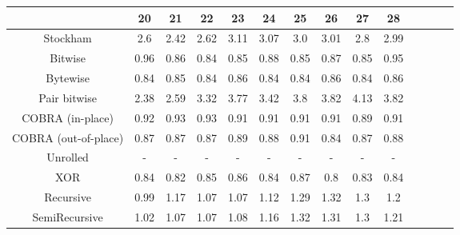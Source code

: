 \begin{tabular}{c|ccccccccccccc}{} &    20 &    21 &    22 &    23 &    24 &    25 &    26 &    27 &    28 \\
\midrule
Stockham             &   2.6 &  2.42 &  2.62 &  3.11 &  3.07 &   3.0 &  3.01 &   2.8 &  2.99 \\
Bitwise              &  0.96 &  0.86 &  0.84 &  0.85 &  0.88 &  0.85 &  0.87 &  0.85 &  0.95 \\
Bytewise             &  0.84 &  0.85 &  0.84 &  0.86 &  0.84 &  0.84 &  0.86 &  0.84 &  0.86 \\
Pair bitwise         &  2.38 &  2.59 &  3.32 &  3.77 &  3.42 &   3.8 &  3.82 &  4.13 &  3.82 \\
COBRA (in-place)     &  0.92 &  0.93 &  0.93 &  0.91 &  0.91 &  0.91 &  0.91 &  0.89 &  0.91 \\
COBRA (out-of-place) &  0.87 &  0.87 &  0.87 &  0.89 &  0.88 &  0.91 &  0.84 &  0.87 &  0.88 \\
Unrolled             &     - &     - &     - &     - &     - &     - &     - &     - &     - \\
XOR                  &  0.84 &  0.82 &  0.85 &  0.86 &  0.84 &  0.87 &   0.8 &  0.83 &  0.84 \\
Recursive            &  0.99 &  1.17 &  1.07 &  1.07 &  1.12 &  1.29 &  1.32 &   1.3 &   1.2 \\
SemiRecursive        &  1.02 &  1.07 &  1.07 &  1.08 &  1.16 &  1.32 &  1.31 &   1.3 &  1.21 \\
\end{tabular}